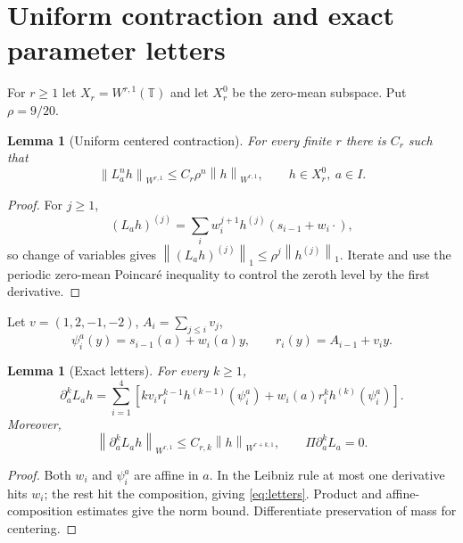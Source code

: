 \documentclass[11pt,reqno]{amsart}
\newtheorem{lemma}[theorem]{Lemma}
\theoremstyle{definition}
\theoremstyle{remark}
\newcommand{\T}{\mathbb T}
\newcommand{\Piop}{\Pi}
\newcommand{\norm}[1]{\left\lVert #1\right\rVert}
\begin{document}
\section{Uniform contraction and exact parameter letters}\label{sec:letters}
For $r\ge1$ let $X_r=W^{r,1}(\T)$ and let $X_r^0$ be the zero-mean subspace.
Put $\rho=9/20$.

\begin{lemma}[Uniform centered contraction]\label{lem:contraction}
For every finite $r$ there is $C_r$ such that
\[
 \norm{L_a^nh}_{W^{r,1}}
 \le C_r\rho^n\norm h_{W^{r,1}},
 \qquad h\in X_r^0,\ a\in I.
\]
\end{lemma}

\begin{proof}
For $j\ge1$,
\[
 (L_ah)^{(j)}=
 \sum_iw_i^{j+1}h^{(j)}(s_{i-1}+w_i\cdot),
\]
so change of variables gives
$\norm{(L_ah)^{(j)}}_1\le\rho^j\norm{h^{(j)}}_1$.
Iterate and use the periodic zero-mean Poincar\'e inequality to control the
zeroth level by the first derivative.
\end{proof}

Let $v=(1,2,-1,-2)$, $A_i=\sum_{j\le i}v_j$,
\[
 \psi_i^a(y)=s_{i-1}(a)+w_i(a)y,
 \qquad r_i(y)=A_{i-1}+v_i y.
\]

\begin{lemma}[Exact letters]\label{lem:letters}
For every $k\ge1$,
\begin{equation}\label{eq:letters}
 \partial_a^kL_ah=
 \sum_{i=1}^4\left[
 kv_ir_i^{k-1}h^{(k-1)}(\psi_i^a)
 +w_i(a)r_i^kh^{(k)}(\psi_i^a)
 \right].
\end{equation}
Moreover,
\[
 \norm{\partial_a^kL_ah}_{W^{r,1}}
 \le C_{r,k}\norm h_{W^{r+k,1}},
 \qquad \Piop\partial_a^kL_a=0.
\]
\end{lemma}

\begin{proof}
Both $w_i$ and $\psi_i^a$ are affine in $a$.  In the Leibniz rule at most one
derivative hits $w_i$; the rest hit the composition, giving
\eqref{eq:letters}.  Product and affine-composition estimates give the norm
bound.  Differentiate preservation of mass for centering.
\end{proof}
\end{document}
